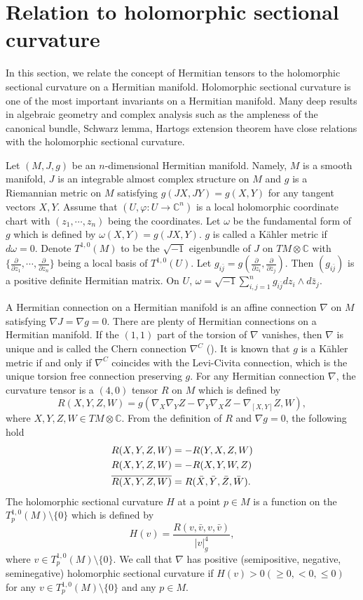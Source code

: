 \documentclass[10pt,reqno]{amsart}
\theoremstyle{definition}
\begin{document}
\section{Relation to holomorphic sectional curvature}
In this section, we relate the concept of Hermitian tensors to the holomorphic sectional curvature on a Hermitian manifold. Holomorphic sectional curvature is one of the most important invariants on a Hermitian manifold. Many deep results in algebraic geometry and complex analysis such as the ampleness of the canonical bundle, Schwarz lemma, Hartogs extension theorem have close relations with the holomorphic sectional curvature.

Let $(M,J, g)$ be an $n$-dimensional Hermitian manifold. Namely, $M$ is a smooth manifold, $J$ is an integrable almost complex structure on $M$ and $g$ is a Riemannian metric on $M$ satisfying $g(JX,JY)=g(X,Y)$ for any tangent vectors $X,Y$. Assume that $(U, \varphi:U\rightarrow \mathbb C^n)$ is a local holomorphic coordinate chart with $(z_1, \cdots, z_n)$ being the coordinates. Let $\omega$ be the fundamental form of $g$ which is defined by $\omega(X,Y)=g(JX,Y)$. $g$ is called a K\"ahler metric if $d\omega=0$. Denote $T^{1,0}(M)$ to be the $\sqrt{-1}$ eigenbundle of $J$ on $TM\otimes \mathbb C$ with $\{\frac{\partial}{\partial z_1}, \cdots, \frac{\partial}{\partial z_n}\}$ being a local basis of $T^{1,0}(U)$. Let $g_{i\bar{j}}=g(\frac{\partial}{\partial z_i}, \frac{\partial}{\partial \bar{z}_j})$. Then $(g_{i\bar{j}})$ is a positive definite Hermitian matrix. On $U$, $\omega=\sqrt{-1}\sum_{i,j=1}^ng_{i\bar{j}}dz_i\wedge d\bar{z}_j$. 

A Hermitian connection on a Hermitian manifold is an affine connection $\nabla$ on $M$ satisfying $\nabla J=\nabla g=0$. There are plenty of Hermitian connections on a Hermitian manifold. If the $(1,1)$ part of the torsion of $\nabla$ vanishes, then $\nabla$ is unique and is called the Chern connection  $\nabla^C$ (\cite{Z}). It is known that $g$ is a K\"ahler metric if and only if $\nabla^C$ coincides with the Levi-Civita connection, which is the unique torsion free connection preserving $g$. For any Hermitian connection $\nabla$, the curvature tensor is a $(4,0)$ tensor $R$ on $M$ which is defined by 
$$R(X,Y,Z,W)=g(\nabla_X\nabla_YZ-\nabla_Y\nabla_XZ-\nabla_{[X,Y]}Z, W),$$ where $X,Y,Z,W\in TM\otimes \mathbb C$. From the definition of $R$ and $\nabla g=0$, the following hold
\begin{align}
 R(X,Y,Z,W)&=-R(Y,X,Z,W) \notag \\
R(X,Y,Z,W)&=-R(X,Y,W,Z)\notag \\
\overline{R(X,Y,Z,W)}&=R(\bar{X},\bar{Y},\bar{Z},\bar{W}).\label{5.1}
\end{align} 
The holomorphic sectional curvature $H$ at a point $p\in M$ is a function on the $T_p^{1,0}(M)\setminus \{0\}$ which is defined by $$H(v)=\dfrac{R(v,\bar{v},v,\bar{v})}{|v|_g^4},$$ where $v\in T_p^{1,0}(M)\setminus \{0\}$. We call that $\nabla$ has positive (semipositive, negative, seminegative) holomorphic sectional curvature if $H(v)>0 (\geq 0, <0, \leq 0)$ for any $v\in T_p^{1,0}(M)\setminus \{0\}$ and any $p\in M$.
\end{document}
